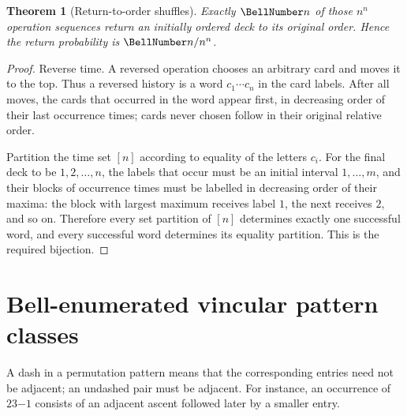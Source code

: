 \documentclass[11pt,a4paper,oneside,openany]{book}
\newtheorem{theorem}{Theorem}[chapter]
\theoremstyle{definition}
\theoremstyle{remark}
\begin{document}
\begin{theorem}[Return-to-order shuffles]
Exactly $\BellNumber n$ of those $n^n$ operation sequences return an initially ordered
deck to its original order.  Hence the return probability is $\BellNumber n/n^n$.
\end{theorem}
\begin{proof}
Reverse time.  A reversed operation chooses an arbitrary card and moves it to the
top.  Thus a reversed history is a word $c_1\cdots c_n$ in the card labels.  After
all moves, the cards that occurred in the word appear first, in decreasing order of
their last occurrence times; cards never chosen follow in their original relative
order.

Partition the time set $[n]$ according to equality of the letters $c_i$.  For the
final deck to be $1,2,\ldots,n$, the labels that occur must be an initial interval
$1,\ldots,m$, and their blocks of occurrence times must be labelled in decreasing
order of their maxima: the block with largest maximum receives label $1$, the next
receives $2$, and so on.  Therefore every set partition of $[n]$ determines exactly
one successful word, and every successful word determines its equality partition.
This is the required bijection.
\end{proof}

\section{Bell-enumerated vincular pattern classes}
A dash in a permutation pattern means that the corresponding entries need not be
adjacent; an undashed pair must be adjacent.  For instance, an occurrence of
$23\!\mathord{-}\!1$ consists of an adjacent ascent followed later by a smaller
entry.
\end{document}
